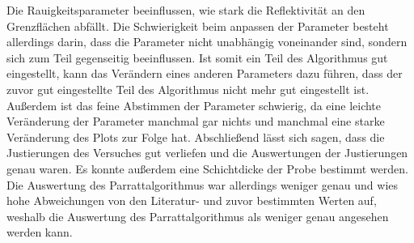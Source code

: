 Die Rauigkeitsparameter beeinflussen, wie stark die Reflektivität an den Grenzflächen abfällt.
Die Schwierigkeit beim anpassen der Parameter besteht allerdings darin, dass die Parameter nicht unabhängig voneinander sind, sondern sich zum Teil gegenseitig beeinflussen.
Ist somit ein Teil des Algorithmus gut eingestellt, kann das Verändern eines anderen Parameters dazu führen, dass der zuvor gut eingestellte Teil des Algorithmus nicht mehr gut eingestellt ist.
Außerdem ist das feine Abstimmen der Parameter schwierig, da eine leichte Veränderung der Parameter manchmal gar nichts und manchmal eine starke Veränderung des Plots zur Folge hat. \newline
Abschließend lässt sich sagen, dass die Justierungen des Versuches gut verliefen und die Auswertungen der Justierungen genau waren.
Es konnte außerdem eine Schichtdicke der Probe bestimmt werden.
Die Auswertung des Parrattalgorithmus war allerdings weniger genau und wies hohe Abweichungen von den Literatur- und zuvor bestimmten Werten auf, weshalb die Auswertung des Parrattalgorithmus als weniger genau angesehen werden kann.